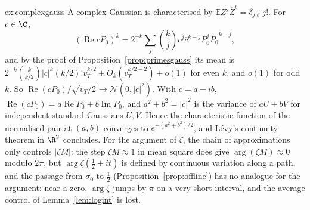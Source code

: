 \begin{solution}{ex:complexgauss}
\idea A complex Gaussian is characterised by $\mathbb EZ^j\overline Z^\ell=\delta_{j\ell}\,j!$.
\writeup For $c\in\C$,
\[
(\operatorname{Re}cP_0)^k=2^{-k}\sum_j\binom kjc^j\overline c^{k-j}P_0^j\overline{P_0}^{k-j},
\]
and by the proof of Proposition~\ref{prop:primesgauss} its mean is $2^{-k}\binom k{k/2}|c|^k(k/2)!v_T^{k/2}+O_k(v_T^{k/2-2})+o(1)$ for even $k$, and $o(1)$ for odd $k$. So $\operatorname{Re}(cP_0)/\sqrt{v_T/2}\to\mathcal N(0,|c|^2)$. With $c=a-ib$, $\operatorname{Re}(cP_0)=a\operatorname{Re}P_0+b\operatorname{Im}P_0$, and $a^2+b^2=|c|^2$ is the variance of $aU+bV$ for independent standard Gaussians $U,V$. Hence the characteristic function of the normalised pair at $(a,b)$ converges to $e^{-(a^2+b^2)/2}$, and Lévy's continuity theorem in $\R^2$ concludes. For the argument of $\zeta$, the chain of approximations only controls $|\zeta M|$: the step $\zeta M\approx1$ in mean square does give $\arg(\zeta M)\approx0$ modulo $2\pi$, but $\arg\zeta(\frac12+it)$ is defined by continuous variation along a path, and the passage from $\sigma_0$ to $\frac12$ (Proposition~\ref{prop:offline}) has no analogue for the argument: near a zero, $\arg\zeta$ jumps by $\pi$ on a very short interval, and the average control of Lemma~\ref{lem:logint} is lost.
\end{solution}

